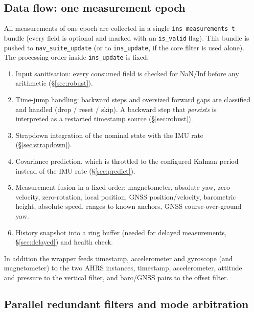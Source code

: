 \documentclass[11pt,a4paper]{article}
\newcommand{\code}[1]{\texttt{#1}}
\begin{document}
\subsection{Data flow: one measurement epoch}

All measurements of one epoch are collected in a single
\code{ins\_\allowbreak{}measurements\_\allowbreak{}t} bundle (every field is
optional and marked with an \code{is\_\allowbreak{}valid} flag). This bundle is
pushed to \code{nav\_\allowbreak{}suite\_\allowbreak{}update} (or to
\code{ins\_\allowbreak{}update}, if the core filter is used alone). The
processing order inside \code{ins\_\allowbreak{}update} is fixed:

\begin{enumerate}
  \item Input sanitisation: every consumed field is checked for NaN/Inf before
        any arithmetic (\S\ref{sec:robust}).
  \item Time-jump handling: backward steps and oversized forward gaps are
        classified and handled (drop / reset / skip). A backward step that
        \emph{persists} is interpreted as a restarted timestamp source
        (\S\ref{sec:robust}).
  \item Strapdown integration of the nominal state with the IMU rate
        (\S\ref{sec:strapdown}).
  \item Covariance prediction, which is throttled to the configured Kalman
        period instead of the IMU rate (\S\ref{sec:predict}).
  \item Measurement fusion in a fixed order: magnetometer, absolute yaw,
        zero-velocity, zero-rotation, local position, GNSS position/velocity,
        barometric height, absolute speed, ranges to known anchors, GNSS
        course-over-ground yaw.
  \item History snapshot into a ring buffer (needed for delayed measurements,
        \S\ref{sec:delayed}) and health check.
\end{enumerate}

In addition the wrapper feeds timestamp, accelerometer and gyroscope (and
magnetometer) to the two AHRS instances, timestamp, accelerometer, attitude and
pressure to the vertical filter, and baro/GNSS pairs to the offset filter.

\subsection{Parallel redundant filters and mode arbitration}
\label{sec:suite}
\end{document}
